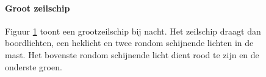 \vspace{-0.6cm}
\begin{figure}[H]
	\centering
	\begin{minipage}[t]{0.75\textwidth}
		\paragraph{Groot zeilschip}
		Figuur \ref{pic:optisch:grootzeil} toont een grootzeilschip bij nacht. Het zeilschip draagt dan boordlichten, een heklicht en twee rondom schijnende lichten in de mast. Het bovenste rondom schijnende licht dient rood te zijn en de onderste groen. 
	\end{minipage}
	\hfill
	\begin{minipage}[t]{0.22\textwidth}
		\RemoveLine
		\caption{}
		\label{pic:optisch:grootzeil}
	\end{minipage}
\end{figure}
\vspace{-0.6cm}
